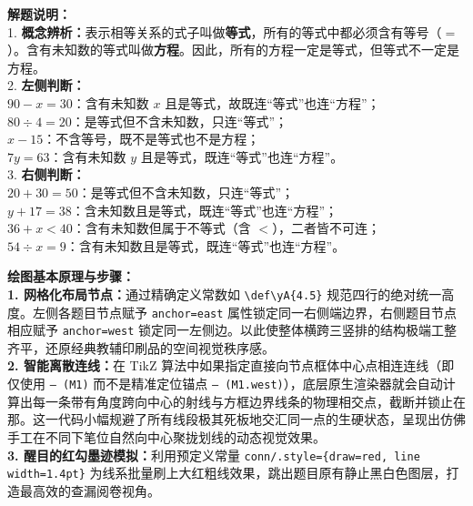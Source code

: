 \vspace{0.6cm}

{\small\color{gray}
\textbf{解题说明：}\\
1. \textbf{概念辨析：}表示相等关系的式子叫做\textbf{等式}，所有的等式中都必须含有等号（$=$）。含有未知数的等式叫做\textbf{方程}。因此，所有的方程一定是等式，但等式不一定是方程。\\
2. \textbf{左侧判断：}\\
\quad $90-x=30$：含有未知数 $x$ 且是等式，故既连“等式”也连“方程”；\\
\quad $80\div4=20$：是等式但不含未知数，只连“等式”；\\
\quad $x-15$：不含等号，既不是等式也不是方程；\\
\quad $7y=63$：含有未知数 $y$ 且是等式，既连“等式”也连“方程”。\\
3. \textbf{右侧判断：}\\
\quad $20+30=50$：是等式但不含未知数，只连“等式”；\\
\quad $y+17=38$：含未知数且是等式，既连“等式”也连“方程”；\\
\quad $36+x<40$：含有未知数但属于不等式（含 $<$），二者皆不可连；\\
\quad $54\div x=9$：含有未知数且是等式，既连“等式”也连“方程”。
}

\vspace{0.6cm}

{\small\color{blue!70!black}
\textbf{绘图基本原理与步骤：}\\
\textbf{1. 网格化布局节点：}通过精确定义常数如 \texttt{\textbackslash def\textbackslash yA\{4.5\}} 规范四行的绝对统一高度。左侧各题目节点赋予 \texttt{anchor=east} 属性锁定同一右侧端边界，右侧题目节点相应赋予 \texttt{anchor=west} 锁定同一左侧边。以此使整体横跨三竖排的结构极端工整齐平，还原经典教辅印刷品的空间视觉秩序感。\\
\textbf{2. 智能离散连线：}在 TikZ 算法中如果指定直接向节点框体中心点相连连线（即仅使用 \texttt{-- (M1)} 而不是精准定位锚点 \texttt{-- (M1.west)}），底层原生渲染器就会自动计算出每一条带有角度跨向中心的射线与方框边界线条的物理相交点，截断并锁止在那。这一代码小幅规避了所有线段极其死板地交汇同一点的生硬状态，呈现出仿佛手工在不同下笔位自然向中心聚拢划线的动态视觉效果。\\
\textbf{3. 醒目的红勾墨迹模拟：}利用预定义常量 \texttt{conn/.style=\{draw=red, line width=1.4pt\}} 为线系批量刷上大红粗线效果，跳出题目原有静止黑白色图层，打造最高效的查漏阅卷视角。
}



\newpage

